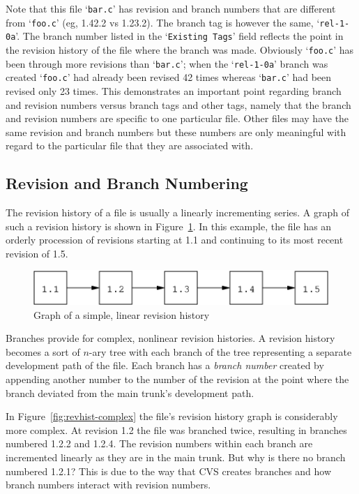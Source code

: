 \documentclass[12pt,letterpaper]{article}
\newcommand{\cmd}[1]{`\texttt{#1}'}
\begin{document}
Note that this file \cmd{bar.c} has revision and branch numbers that are
different from \cmd{foo.c} (eg, 1.42.2 vs 1.23.2).  The branch tag is however
the same, \cmd{rel-1-0a}.  The branch number listed in the \cmd{Existing Tags}
field reflects the point in the revision history of the file where the branch
was made.  Obviously \cmd{foo.c} has been through more revisions than
\cmd{bar.c}; when the \cmd{rel-1-0a} branch was created \cmd{foo.c} had
already been revised 42 times whereas \cmd{bar.c} had been revised only 23
times.  This demonstrates an important point regarding branch and revision
numbers versus branch tags and other tags, namely that the branch and revision
numbers are specific to one particular file.  Other files may have the same
revision and branch numbers but these numbers are only meaningful with regard
to the particular file that they are associated with.

\subsection{Revision and Branch Numbering}

The revision history of a file is usually a linearly incrementing series.  A
graph of such a revision history is shown in Figure~\ref{fig:revhist-simple}.
In this example, the file has an orderly procession of revisions starting at
1.1 and continuing to its most recent revision of 1.5.

\begin{figure}[htb]
\begin{center}
\includegraphics{revhist-simple.eps}
\end{center}
\caption{Graph of a simple, linear revision history}
\label{fig:revhist-simple}
\end{figure}

Branches provide for complex, nonlinear revision histories.  A revision
history becomes a sort of $n$-ary tree with each branch of the tree
representing a separate development path of the file.  Each branch has a
\emph{branch number} created by appending another number to the number of the
revision at the point where the branch deviated from the main trunk's
development path.

In Figure~\ref{fig:revhist-complex} the file's revision history graph is
considerably more complex.  At revision 1.2 the file was branched twice,
resulting in branches numbered 1.2.2 and 1.2.4.  The revision numbers within
each branch are incremented linearly as they are in the main trunk.  But why
is there no branch numbered 1.2.1?  This is due to the way that CVS creates
branches and how branch numbers interact with revision numbers.
\end{document}
